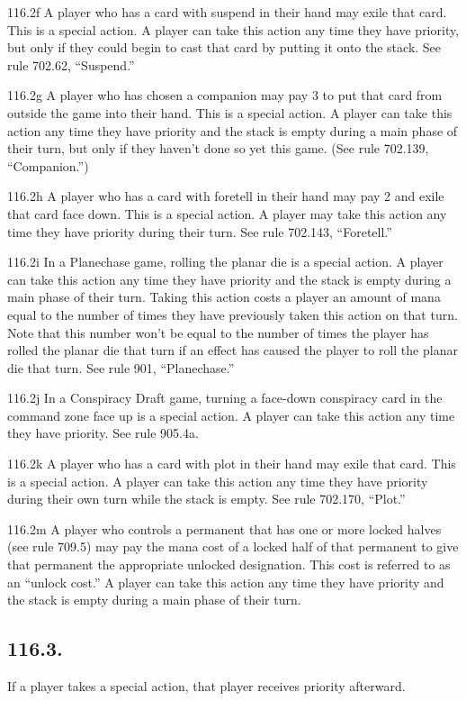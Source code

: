 116.2f A player who has a card with suspend in their hand may exile that card. This is a special action. A player can take this action any time they have priority, but only if they could begin to cast that card by putting it onto the stack. See rule 702.62, “Suspend.”

116.2g A player who has chosen a companion may pay {3} to put that card from outside the game into their hand. This is a special action. A player can take this action any time they have priority and the stack is empty during a main phase of their turn, but only if they haven’t done so yet this game. (See rule 702.139, “Companion.”)

116.2h A player who has a card with foretell in their hand may pay {2} and exile that card face down. This is a special action. A player may take this action any time they have priority during their turn. See rule 702.143, “Foretell.”

116.2i In a Planechase game, rolling the planar die is a special action. A player can take this action any time they have priority and the stack is empty during a main phase of their turn. Taking this action costs a player an amount of mana equal to the number of times they have previously taken this action on that turn. Note that this number won’t be equal to the number of times the player has rolled the planar die that turn if an effect has caused the player to roll the planar die that turn. See rule 901, “Planechase.”

116.2j In a Conspiracy Draft game, turning a face-down conspiracy card in the command zone face up is a special action. A player can take this action any time they have priority. See rule 905.4a.

116.2k A player who has a card with plot in their hand may exile that card. This is a special action. A player can take this action any time they have priority during their own turn while the stack is empty. See rule 702.170, “Plot.”

116.2m A player who controls a permanent that has one or more locked halves (see rule 709.5) may pay the mana cost of a locked half of that permanent to give that permanent the appropriate unlocked designation. This cost is referred to as an “unlock cost.” A player can take this action any time they have priority and the stack is empty during a main phase of their turn.

\subsection*{116.3.}
If a player takes a special action, that player receives priority afterward.

